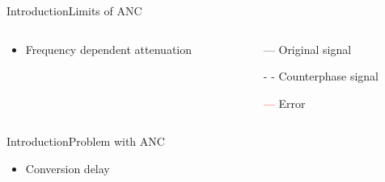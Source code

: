 \begin{frame}{Introduction}{Limits of ANC}		
	\begin{columns}
		\begin{column}{0.5\textwidth}
			\begin{itemize}
				\item Frequency dependent attenuation	
			\end{itemize}
			\vspace{8.5mm}			
		\begin{center}
	 		
	 	\end{center}
		\end{column}
		\begin{column}{0.5\textwidth} 
		\begin{itemize}
			\item[\textcolor{MATLABblue}{---}] Original signal
			\item[\textcolor{MATLABblue}{- -}] Counterphase signal
			\item[\textcolor{red}{---}] Error
		\end{itemize}
		\begin{center}
	 		
	 	\end{center}
		\end{column}
	\end{columns}
\end{frame}





\begin{frame}{Introduction}{Problem with ANC}		
	\begin{itemize}
		\item Conversion delay
	\end{itemize}
\end{frame}

